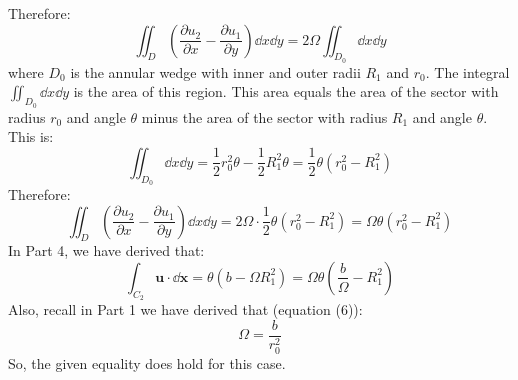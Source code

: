 \documentclass{article}
\begin{document}
\begin{enumerate}
\begin{enumerate}
\begin{enumerate}
    Therefore:
    \begin{equation}
      \iint_D \left(\frac{\partial u_2}{\partial x} - \frac{\partial u_1}{\partial y}\right) \dd x\dd y = 2\Omega\iint_{D_0} \dd x \dd y
    \end{equation}
    where \(D_0\) is the annular wedge with inner and outer radii \(R_1\) and \(r_0\). The integral \(\iint_{D_0} \dd x \dd y\)
    is the area of this region. This area equals the area of the sector with radius \(r_0\) and angle \(\theta\) minus the area of the sector with radius \(R_1\) and angle \(\theta\). This is:
    \begin{equation}
      \iint_{D_0} \dd x \dd y = \frac{1}{2}r_0^2 \theta - \frac{1}{2}R_1^2\theta = \frac{1}{2}\theta(r_0^2 -R_1^2)
    \end{equation}
    Therefore:
    \begin{equation}
      \iint_D \left(\frac{\partial u_2}{\partial x} - \frac{\partial u_1}{\partial y}\right) \dd x\dd y = 2\Omega \cdot
      \frac{1}{2}\theta(r_0^2 -R_1^2) = \Omega\theta (r_0^2-R_1^2)
    \end{equation}
    In Part 4, we have derived that:
    \begin{equation}
        \int_{C_2} \mathbf{u}\cdot \dd \mathbf{x} = \theta(b - \Omega R_1^2) = \Omega \theta \left(\frac{b}{\Omega} - R_1^2\right)
    \end{equation}
    Also, recall in Part 1 we have derived that (equation (6)):
    \begin{equation}
      \Omega = \frac{b}{r_0^2}
    \end{equation}
    So, the given equality does hold for this case. \\
    \\
  \end{enumerate}
\end{enumerate}
\end{enumerate}
\end{document}
